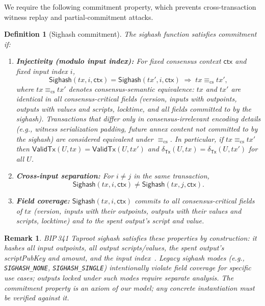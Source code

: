\documentclass[11pt]{article}
\newtheorem{definition}{Definition}
\newtheorem{remark}{Remark}
\newcommand{\Tx}{\mathsf{Tx}}
\newcommand{\Sighash}{\mathsf{Sighash}}
\newcommand{\ValidTx}{\mathsf{ValidTx}}
\newcommand{\DeltaTx}{\delta_{\Tx}}
\begin{document}
We require the following commitment property, which prevents cross-transaction witness replay and partial-commitment attacks.

\begin{definition}[Sighash commitment]\label{def:sighash-commit}
The sighash function satisfies \emph{commitment} if:
\begin{enumerate}[leftmargin=2em]
  \item \textbf{Injectivity (modulo input index):}
  For fixed consensus context $\textsf{ctx}$ and fixed input index $i$,
  \[
    \Sighash(tx,i,\textsf{ctx}) = \Sighash(tx',i,\textsf{ctx}) \;\Longrightarrow\; tx \equiv_{\mathrm{cs}} tx',
  \]
  where $tx \equiv_{\mathrm{cs}} tx'$ denotes \emph{consensus-semantic equivalence}: $tx$ and $tx'$ are identical in all consensus-critical fields (version, inputs with outpoints, outputs with values and scripts, locktime, and all fields committed to by the sighash).
  Transactions that differ only in consensus-irrelevant encoding details (e.g., witness serialization padding, future annex content not committed to by the sighash) are considered equivalent under $\equiv_{\mathrm{cs}}$.
  In particular, if $tx \equiv_{\mathrm{cs}} tx'$ then $\ValidTx(U,tx)=\ValidTx(U,tx')$ and $\DeltaTx(U,tx)=\DeltaTx(U,tx')$ for all $U$.
  \item \textbf{Cross-input separation:}
  For $i\neq j$ in the same transaction,
  \[
    \Sighash(tx,i,\textsf{ctx}) \neq \Sighash(tx,j,\textsf{ctx}).
  \]
  \item \textbf{Field coverage:}
  $\Sighash(tx,i,\textsf{ctx})$ commits to all consensus-critical fields of $tx$ (version, inputs with their outpoints, outputs with their values and scripts, locktime) and to the spent output's script and value.
\end{enumerate}
\end{definition}

\begin{remark}
BIP\,341 Taproot sighash satisfies these properties by construction: it hashes all input outpoints, all output scripts/values, the spent output's scriptPubKey and amount, and the input index~\cite{bip341}.
Legacy sighash modes (e.g., \texttt{SIGHASH\_NONE}, \texttt{SIGHASH\_SINGLE}) intentionally violate field coverage for specific use cases; outputs locked under such modes require separate analysis.
The commitment property is an \emph{axiom} of our model; any concrete instantiation must be verified against it.
\end{remark}
\end{document}
